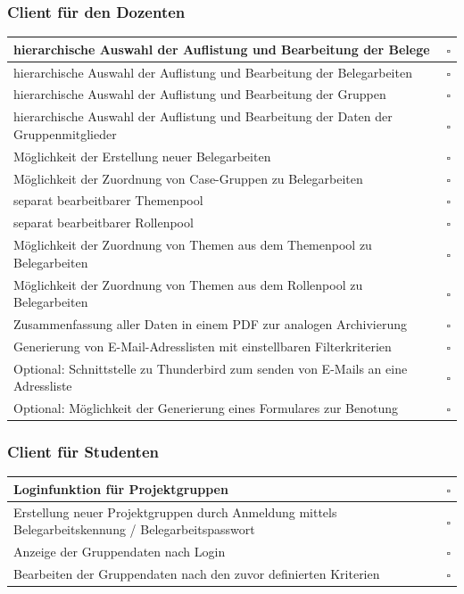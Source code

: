 \documentclass{article}
\begin{document}
\subsubsection{Client für den Dozenten}
\begin{tabular}{p{17cm} c}
	hierarchische Auswahl der Auflistung und Bearbeitung der Belege							&	$\square$	\\
\hline
	hierarchische Auswahl der Auflistung und Bearbeitung der Belegarbeiten					&	$\square$	\\
\hline
	hierarchische Auswahl der Auflistung und Bearbeitung der Gruppen						&	$\square$	\\
\hline
	hierarchische Auswahl der Auflistung und Bearbeitung der Daten der Gruppenmitglieder	&	$\square$	\\
\hline
	Möglichkeit der Erstellung neuer Belegarbeiten											&	$\square$	\\
\hline
	Möglichkeit der Zuordnung von Case-Gruppen zu Belegarbeiten								&	$\square$	\\
\hline
	separat bearbeitbarer Themenpool														&	$\square$	\\
\hline
	separat bearbeitbarer Rollenpool														&	$\square$	\\
\hline
	Möglichkeit der Zuordnung von Themen aus dem Themenpool zu Belegarbeiten				&	$\square$	\\
\hline
	Möglichkeit der Zuordnung von Themen aus dem Rollenpool zu Belegarbeiten				&	$\square$	\\
\hline
	Zusammenfassung aller Daten in einem PDF zur analogen Archivierung						&	$\square$	\\
\hline
	Generierung von E-Mail-Adresslisten mit einstellbaren Filterkriterien					&	$\square$	\\
\hline
	Optional: Schnittstelle zu Thunderbird zum senden von E-Mails an eine Adressliste		&	$\square$	\\
\hline
	Optional: Möglichkeit der Generierung eines Formulares zur Benotung				 		&	$\square$	\\
\end{tabular}

\subsubsection{Client für Studenten}
\begin{tabular}{p{17cm} c}
	Loginfunktion für Projektgruppen																	&	$\square$	\\
\hline
	Erstellung neuer Projektgruppen durch Anmeldung mittels Belegarbeitskennung / Belegarbeitspasswort	&	$\square$	\\
\hline
	Anzeige der Gruppendaten nach Login																	&	$\square$	\\
\hline
	Bearbeiten der Gruppendaten nach den zuvor definierten Kriterien									&	$\square$	\\
\end{tabular}
\end{document}
